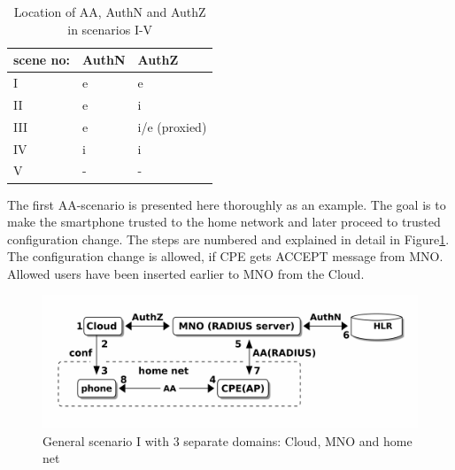 \documentclass[12pt,a4paper,english]{tutthesis}
\begin{document}
\begin{otherlanguage}{english}
\begin{table}[htb]
\caption{\label{table-scenarios}Location of AA, AuthN and AuthZ in scenarios I-V}
\centering
\begin{tabular}{lll}
scene no: & AuthN & AuthZ\\
\hline
I & e & e\\
II & e & i\\
III & e & i/e (proxied)\\
IV & i & i\\
V & - & -\\
\end{tabular}
\end{table}
\label{scenario-i}
The first AA-scenario is presented here thoroughly as an example.
The goal is to make the smartphone trusted to the home network and
later proceed to trusted configuration change.
The steps are numbered and explained in detail in Figure\ref{fig:scenario-I}.
The configuration change is allowed, if CPE gets ACCEPT message from
MNO. Allowed users have been inserted earlier to MNO from the Cloud.


\begin{figure}[htb]
\centering
\includegraphics[width=.9\linewidth]{scenI.png}
\caption{\label{fig:scenario-I}General scenario I with 3 separate domains: Cloud, MNO and home net}
\end{figure}



\end{otherlanguage}
\end{document}

